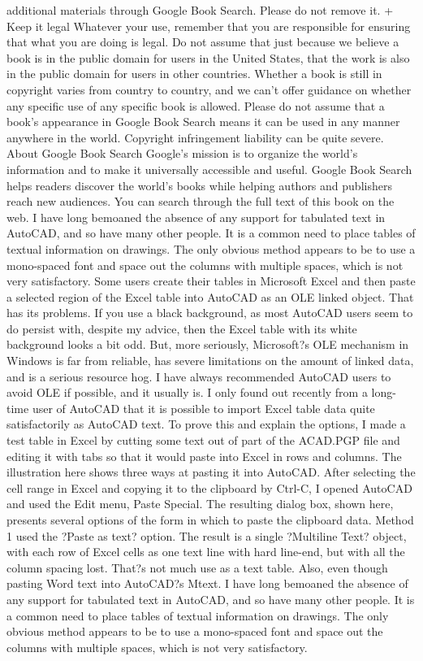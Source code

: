 \documentclass[a4paper]{article}
\begin{document}
additional materials through Google Book Search. Please do not remove it. 
+ Keep it legal Whatever your use, remember that you are responsible for ensuring that what you are doing is legal. Do not assume that just 
because we believe a book is in the public domain for users in the United States, that the work is also in the public domain for users in other 
countries. Whether a book is still in copyright varies from country to country, and we can't offer guidance on whether any specific use of 
any specific book is allowed. Please do not assume that a book's appearance in Google Book Search means it can be used in any manner 
anywhere in the world. Copyright infringement liability can be quite severe. 
About Google Book Search 
Google's mission is to organize the world's information and to make it universally accessible and useful. Google Book Search helps readers 
discover the world's books while helping authors and publishers reach new audiences. You can search through the full text of this book on the web. I have long bemoaned the absence of any support for tabulated text in AutoCAD, and so have many other people. It is a common need to place tables of textual information on drawings. The only obvious method appears to be to use a mono-spaced font and space out the columns with multiple spaces, which is not very satisfactory.
Some users create their tables in Microsoft Excel and then paste a selected region of the Excel table into AutoCAD as an OLE linked object. That has its problems. If you use a black background, as most AutoCAD users seem to do persist with, despite my advice, then the Excel table with its white background looks a bit odd. But, more seriously, Microsoft?s OLE mechanism in Windows is far from reliable, has severe limitations on the amount of linked data, and is a serious resource hog. I have always recommended AutoCAD users to avoid OLE if possible, and it usually is.
I only found out recently from a long-time user of AutoCAD that it is possible to import Excel table data quite satisfactorily as AutoCAD text. To prove this and explain the options, I made a test table in Excel by cutting some text out of part of the ACAD.PGP file and editing it with tabs so that it would paste into Excel in rows and columns. The illustration here shows three ways at pasting it into AutoCAD. After selecting the cell range in Excel and copying it to the clipboard by Ctrl-C, I opened AutoCAD and used the Edit menu, Paste Special. The resulting dialog box, shown here, presents several options of the form in which to paste the clipboard data.
Method 1 used the ?Paste as text? option. The result is a single ?Multiline Text? object, with each row of Excel cells as one text line with hard line-end, but with all the column spacing lost. That?s not much use as a text table. Also, even though pasting Word text into AutoCAD?s Mtext. I have long bemoaned the absence of any support for tabulated text in AutoCAD, and so have many other people. It is a common need to place tables of textual information on drawings. The only obvious method appears to be to use a mono-spaced font and space out the columns with multiple spaces, which is not very satisfactory.
\end{document}
